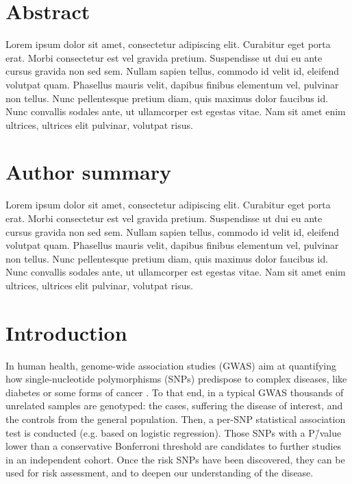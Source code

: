 \documentclass[10pt,letterpaper]{article}
\begin{document}
\section*{Abstract}
Lorem ipsum dolor sit amet, consectetur adipiscing elit. Curabitur eget porta erat. Morbi consectetur est vel gravida pretium. Suspendisse ut dui eu ante cursus gravida non sed sem. Nullam sapien tellus, commodo id velit id, eleifend volutpat quam. Phasellus mauris velit, dapibus finibus elementum vel, pulvinar non tellus. Nunc pellentesque pretium diam, quis maximus dolor faucibus id. Nunc convallis sodales ante, ut ullamcorper est egestas vitae. Nam sit amet enim ultrices, ultrices elit pulvinar, volutpat risus.


\section*{Author summary}
Lorem ipsum dolor sit amet, consectetur adipiscing elit. Curabitur eget porta erat. Morbi consectetur est vel gravida pretium. Suspendisse ut dui eu ante cursus gravida non sed sem. Nullam sapien tellus, commodo id velit id, eleifend volutpat quam. Phasellus mauris velit, dapibus finibus elementum vel, pulvinar non tellus. Nunc pellentesque pretium diam, quis maximus dolor faucibus id. Nunc convallis sodales ante, ut ullamcorper est egestas vitae. Nam sit amet enim ultrices, ultrices elit pulvinar, volutpat risus.

\linenumbers

\section{Introduction}

In human health, genome-wide association studies (GWAS) aim at quantifying how single-nucleotide polymorphisms (SNPs) predispose to complex diseases, like diabetes or some forms of cancer \cite{bush_chapter_2012}. To that end, in a typical GWAS thousands of unrelated samples are genotyped: the cases, suffering the disease of interest, and the controls from the general population. Then, a per-SNP statistical association test is conducted (e.g. based on logistic regression). Those SNPs with a P\=/value lower than a conservative Bonferroni threshold are candidates to further studies in an independent cohort. Once the risk SNPs have been discovered, they can be used for risk assessment, and to deepen our understanding of the disease.
\end{document}
